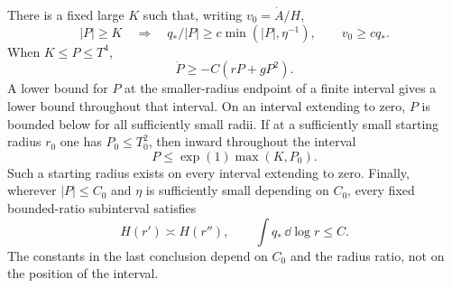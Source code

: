 \begin{lemma}\label{lem:inward-control}
There is a fixed large $K$ such that, writing $v_0=\dot A/H$,
\begin{equation}\label{eq:large-frequency}
 |P|\ge K\quad\Longrightarrow\quad
 q_*/|P|\ge c\min(|P|,\eta^{-1}),\qquad v_0\ge cq_*.
\end{equation}
When $K\le P\le T^4$,
\begin{equation}\label{eq:moderate-frequency}
 \dot P\ge-C(rP+gP^2).
\end{equation}
A lower bound for $P$ at the smaller-radius endpoint of a finite
interval gives a lower bound throughout that interval. On an interval
extending to zero, $P$ is bounded below for all sufficiently small radii.
If at a sufficiently small starting radius $r_0$ one has $P_0\le T_0^2$,
then inward throughout the interval
\begin{equation}\label{eq:inward-upper}
 P\le \exp(1)\max(K,P_0).
\end{equation}
Such a starting radius exists on every interval extending to zero.
Finally, wherever $|P|\le C_0$ and $\eta$ is sufficiently small
depending on $C_0$, every fixed bounded-ratio subinterval satisfies
\begin{equation}\label{eq:height-doubling}
 H(r')\asymp H(r''),\qquad
 \int q_*\,\dd\log r\le C.
\end{equation}
The constants in the last conclusion depend on $C_0$ and the radius
ratio, not on the position of the interval.
\end{lemma}

